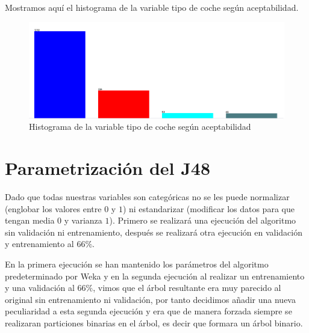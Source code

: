 \documentclass[a4paper, 11pt, twoside, openany, onecolumn, final]{memoir}
\begin{document}
Mostramos aquí el histograma de la variable tipo de coche según aceptabilidad. 
	\begin{figure}
  		\centering
   		\includegraphics[width=1\textwidth]{Imagenes/HistogramaVarSalidaClasif}
  		\caption{Histograma de la variable tipo de coche según aceptabilidad}
  		\label{HistoVarSalidaClasi}
	\end{figure}
	\section{Parametrización del J48}
		Dado que todas nuestras variables son categóricas no se les puede normalizar (englobar los valores entre $0$ y $1$) ni estandarizar (modificar los datos para que tengan media $0$ y varianza $1$). 
		Primero se realizará una ejecución del algoritmo sin validación ni entrenamiento, después se realizará otra ejecución en validación y entrenamiento al $66\%$.
		
		En la primera ejecución se han mantenido los parámetros del algoritmo predeterminado por Weka y en la segunda ejecución al realizar un entrenamiento y una validación al $66\%$, vimos que el árbol resultante era muy parecido al original sin entrenamiento ni validación, por tanto decidimos añadir una nueva peculiaridad a esta segunda ejecución y era que de manera forzada siempre se realizaran particiones binarias en el árbol, es decir que formara un árbol binario.
\end{document}
